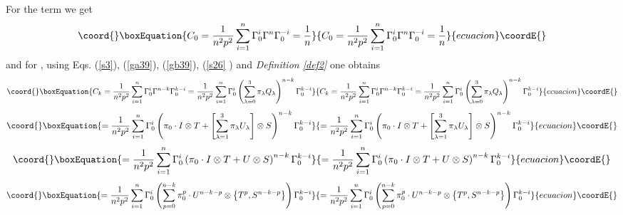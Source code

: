 \documentclass[a4paper,a4paper]{article}
\begin{document}
For the term \coordHE{} we get 
\begin{equation}\coord{}\boxEquation{
C_{0}=\frac{1}{n^{2}p^{2}}\sum_{i=1}^{n}\Gamma _{0}^{i}\Gamma ^{n}\Gamma
_{0}^{-i}=\frac{1}{n}  \label{s33}
}{
C_{0}=\frac{1}{n^{2}p^{2}}\sum_{i=1}^{n}\Gamma _{0}^{i}\Gamma ^{n}\Gamma
_{0}^{-i}=\frac{1}{n}  }{ecuacion}\coordE{}\end{equation}%
and for \coordHE{}, using Eqs. (\ref{s3}), (\ref{ga39}), (\ref{gb39}), (\ref{s26}%
) and \textit{Definition \ref{def2}} one obtains%
\begin{equation}\coord{}\boxEquation{
C_{k}=\frac{1}{n^{2}p^{2}}\sum_{i=1}^{n}\Gamma _{0}^{i}\Gamma ^{n-k}\Gamma
_{0}^{k-i}=\frac{1}{n^{2}p^{2}}\sum_{i=1}^{n}\Gamma _{0}^{i}\left(
\sum_{\lambda =0}^{3}\pi _{\lambda }Q_{\lambda }\right) ^{n-k}\Gamma
_{0}^{k-i}  \label{s34}
}{
C_{k}=\frac{1}{n^{2}p^{2}}\sum_{i=1}^{n}\Gamma _{0}^{i}\Gamma ^{n-k}\Gamma
_{0}^{k-i}=\frac{1}{n^{2}p^{2}}\sum_{i=1}^{n}\Gamma _{0}^{i}\left(
\sum_{\lambda =0}^{3}\pi _{\lambda }Q_{\lambda }\right) ^{n-k}\Gamma
_{0}^{k-i}  }{ecuacion}\coordE{}\end{equation}%
\begin{equation*}\coord{}\boxEquation{
=\frac{1}{n^{2}p^{2}}\sum_{i=1}^{n}\Gamma _{0}^{i}\left( \pi _{0}\cdot
I\otimes T+\left[ \sum_{\lambda =1}^{3}\pi _{\lambda }U_{\lambda }\right]
\otimes S\right) ^{n-k}\Gamma _{0}^{k-i}
}{
=\frac{1}{n^{2}p^{2}}\sum_{i=1}^{n}\Gamma _{0}^{i}\left( \pi _{0}\cdot
I\otimes T+\left[ \sum_{\lambda =1}^{3}\pi _{\lambda }U_{\lambda }\right]
\otimes S\right) ^{n-k}\Gamma _{0}^{k-i}
}{ecuacion}\coordE{}\end{equation*}%
\begin{equation*}\coord{}\boxEquation{
=\frac{1}{n^{2}p^{2}}\sum_{i=1}^{n}\Gamma _{0}^{i}\left( \pi _{0}\cdot
I\otimes T+U\otimes S\right) ^{n-k}\Gamma _{0}^{k-i}
}{
=\frac{1}{n^{2}p^{2}}\sum_{i=1}^{n}\Gamma _{0}^{i}\left( \pi _{0}\cdot
I\otimes T+U\otimes S\right) ^{n-k}\Gamma _{0}^{k-i}
}{ecuacion}\coordE{}\end{equation*}%
\begin{equation*}\coord{}\boxEquation{
=\frac{1}{n^{2}p^{2}}\sum_{i=1}^{n}\Gamma _{0}^{i}\left( \sum_{p=0}^{n-k}\pi
_{0}^{p}\cdot U^{n-k-p}\otimes \left\{ T^{p},S^{n-k-p}\right\} \right)
\Gamma _{0}^{k-i}
}{
=\frac{1}{n^{2}p^{2}}\sum_{i=1}^{n}\Gamma _{0}^{i}\left( \sum_{p=0}^{n-k}\pi
_{0}^{p}\cdot U^{n-k-p}\otimes \left\{ T^{p},S^{n-k-p}\right\} \right)
\Gamma _{0}^{k-i}
}{ecuacion}\coordE{}\end{equation*}%
\end{document}
